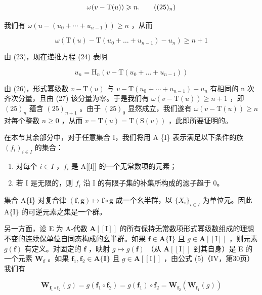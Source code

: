 \[
\omega (v - \mathrm{T} (u)) \geqslant n.\tag{$(25)_{n}$}
\]

我们有 \(\omega(u - (u_{0} + \cdots + u_{n-1})) \geqslant n\) ，从而

\[
\omega (\mathrm{T} (u) - \mathrm{T} (u _ {0} + \dots + u _ {n - 1}) - u _ {n}) \geqslant n + 1\tag{26}
\]

由 (23)，现在递推方程 (24) 表明

\[
u _ {n} = \mathrm{H} _ {n} (v - \mathrm{T} (u _ {0} + \dots + u _ {n - 1}))\tag{27}
\]

由 (26)，形式幂级数 \(v - \mathrm{T}(u)\) 与 \(v - \mathrm{T}(u_{0} + \cdots + u_{n-1}) - u_{n}\) 有相同的 n 次齐次分量，且由 (27) 该分量为零。于是我们有 \(\omega(v - \mathrm{T}(u)) \geqslant n + 1\) ，即 \((25)_{n}\) 蕴含 \((25)_{n+1}\) 。由于 \((25)_{0}\) 显然成立，我们遂有 \(\omega(v - \mathrm{T}(u)) \geqslant n\) 对每个整数 \(n \geqslant 0\) ，从而 \(v = \mathrm{T}(u) = \mathrm{T}(\mathrm{S}(v))\) ，此即所要证明的。

在本节其余部分中，对于任意集合 I，我们将用 A \{I\} 表示满足以下条件的族 \((f_i)_{i\in I}\) 的集合：

\begin{enumerate}
\def\labelenumi{(\roman{enumi})}
\item
  对每个 \(i \in I\) ，\(f_i\) 是 A{[}{[}I{]}{]} 的一个无常数项的元素；
\item
  若 I 是无限的，则 \(f_{i}\) 沿 I 的有限子集的补集所构成的滤子趋于 0。
\end{enumerate}

集合 A\{I\} 对复合律 \((\mathbf{f},\mathbf{g})\mapsto\mathbf{f}\circ\mathbf{g}\) 成一个幺半群，以 \(\{X_{i}\}_{i\in I}\) 为单位元。因此 A\{I\} 的可逆元素之集是一个群。

另一方面，设 E 为 A-代数 \(\mathbf{A}[[\mathrm{I}]]\) 的所有保持无常数项形式幂级数组成的理想不变的连续保单位自同态构成的幺半群。如果 \(\mathbf{f} \in \mathbf{A}\{\mathbf{I}\}\) 且 \(g \in \mathbf{A}[[\mathrm{I}]]\) ，则元素 \(g(\mathbf{f})\) 有定义。对固定的 \(\mathbf{f}\) ，映射 \(g \mapsto g(\mathbf{f})\) （从 \(\mathbf{A}[[\mathrm{I}]]\) 到其自身）是 E 的一个元素 \(\mathbf{W}_{\mathbf{f}}\) 。如果 \(\mathbf{f}_1, \mathbf{f}_2 \in \mathbf{A}\{\mathbf{I}\}\) 且 \(g \in \mathbf{A}[[\mathrm{I}]]\) ，由公式 (5)（IV，第30页）我们有

\[
\mathbf {W} _ {\mathbf {f} _ {1} \circ \mathbf {f} _ {2}} (g) = g (\mathbf {f} _ {1} \circ \mathbf {f} _ {2}) = g (\mathbf {f} _ {1}) \circ \mathbf {f} _ {2} = \mathbf {W} _ {\mathbf {f} _ {2}} (\mathbf {W} _ {\mathbf {f} _ {1}} (g))
\]

